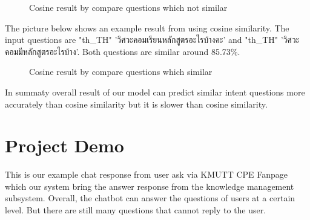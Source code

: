 \documentclass[12pt,oneside,openright,a4paper]{cpe-english-project}
\begin{document}
\begin{figure}[!h]\centering
{}
\caption{Cosine result by compare questions which not similar}\label{fig:Cosine result by compare questions which not similar}
\end{figure}

The picture below shows an example result from using cosine similarity. The input questions are
{
\XeTeXlinebreaklocale "th_TH"	
\thaifont 
'วิศวะคอมเรียนหลักสูตรอะไรบ้างคะ' }
and
{
\XeTeXlinebreaklocale "th_TH"	
\thaifont 
 'วิศวะคอมมีหลักสูตรอะไรบ้าง'. 
}Both questions are similar around 85.73\%.
\begin{figure}[!h]\centering
{}
\caption{Cosine result by compare questions which similar}\label{fig:Cosine result by compare questions which similar}
\end{figure}

In summaty overall result of our model can predict similar intent questions more accurately than cosine similarity but it is slower than cosine similarity.

\section{Project Demo}
\label{ch4_project_demo}
This is our example chat response from user ask via KMUTT CPE Fanpage which our system bring the answer response from the knowledge management subsystem. Overall, the chatbot can answer the questions of users at a certain level. But there are still many questions that cannot reply to the user.
\end{document}
